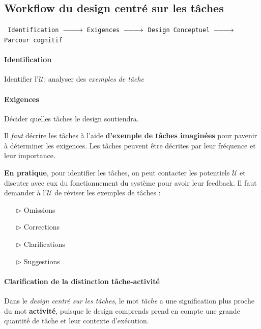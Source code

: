 \documentclass{report}
\DeclareRobustCommand{\looongrightarrow}{%
  \DOTSB\relbar\joinrel\relbar\joinrel\relbar\joinrel\rightarrow
}
\begin{document}
\begin{multicols*}{3}
     \section{Workflow du design centré sur les tâches}
     \texttt{
       Identification $\looongrightarrow$ 
       Exigences $\looongrightarrow$ 
       Design Conceptuel $\looongrightarrow$ 
       Parcour cognitif
     }  

     \paragraph{Identification}
     Identifier l'$\mathcal{U}$; analyser des \textit{exemples de
     tâche} 

     \paragraph{Exigences}
     Décider quelles tâches le design soutiendra.    
    \begin{note}{}{}
      Il \textit{faut} décrire les tâches à l'aide 
      \textbf{d'exemple de tâches imaginées}  pour pavenir 
      à déterminer les exigences. Les tâches peuvent être 
      décrites par leur fréquence et leur importance. 
    \end{note}

    \textbf{En pratique}, pour identifier les tâches, on peut 
    contacter les potentiels $\mathcal{U}$ et discuter 
    avec eux du fonctionnement du système pour avoir  
    leur feedback. Il faut demander à l'$\mathcal{U}$
    de réviser les exemples de tâches : 
    \begin{itemize}
      \item [$\rhd$ ] Omissions 
      \item [$\rhd$ ] Corrections
      \item [$\rhd$ ] Clarifications
      \item [$\rhd$ ] Suggestions
    \end{itemize}


    \paragraph{Clarification de la distinction tâche-activité}
    Dans le 
    \textit{design centré sur les tâches}, 
    le mot \textit{tâche}  
    a une signification plus proche du mot 
    \textbf{activité}, puisque le design comprends 
    prend en compte une grande quantité de tâche et leur 
    contexte d'exécution. 



\end{multicols*}
\end{document}
